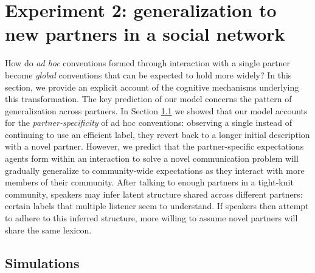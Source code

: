 \documentclass[11pt, floatsintext]{apa6}
\begin{document}
\section{Experiment 2: generalization to new partners in a social network}

How do \emph{ad hoc} conventions formed through interaction with a single partner become \emph{global} conventions that can be expected to hold more widely?
In this section, we provide an explicit account of the cognitive mechanisms underlying this transformation.
The key prediction of our model concerns the pattern of generalization across partners.
In Section \ref{} we showed that our model accounts for the \emph{partner-specificity} of ad hoc conventions: observing a single instead of continuing to use an efficient label, they revert back to a longer initial description with a novel partner.
However, we predict that the partner-specific expectations agents form within an interaction to solve a novel communication problem will gradually generalize to community-wide expectations as they interact with more members of their community. 
After talking to enough partners in a tight-knit community, speakers may infer latent structure shared across different partners: certain labels that multiple listener seem to understand. 
If speakers then attempt to adhere to this inferred structure,  more willing to assume novel partners will share the same lexicon.

\subsection{Simulations}
\end{document}
